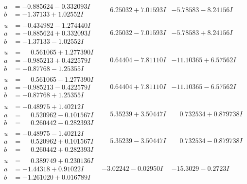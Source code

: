 \documentclass[1p]{elsarticle_modified}
\theoremstyle{definition}
\begin{document}
$$\begin{array}{c|c|c}
\begin{aligned}
a &= -0.885624 - 0.332093 I \\
b &= -1.37133 + 1.02552 I\end{aligned}
 & \phantom{-}6.25032 + 7.01593 I & -5.78583 - 8.24156 I \\ \hline\begin{aligned}
u &= -0.434982 - 1.274440 I \\
a &= -0.885624 + 0.332093 I \\
b &= -1.37133 - 1.02552 I\end{aligned}
 & \phantom{-}6.25032 - 7.01593 I & -5.78583 + 8.24156 I \\ \hline\begin{aligned}
u &= \phantom{-}0.561065 + 1.277390 I \\
a &= -0.985213 + 0.422579 I \\
b &= -0.87768 - 1.25355 I\end{aligned}
 & \phantom{-}0.64404 - 7.81110 I & -11.10365 + 6.57562 I \\ \hline\begin{aligned}
u &= \phantom{-}0.561065 - 1.277390 I \\
a &= -0.985213 - 0.422579 I \\
b &= -0.87768 + 1.25355 I\end{aligned}
 & \phantom{-}0.64404 + 7.81110 I & -11.10365 - 6.57562 I \\ \hline\begin{aligned}
u &= -0.48975 + 1.40212 I \\
a &= \phantom{-}0.520962 - 0.101567 I \\
b &= \phantom{-}0.260442 - 0.282393 I\end{aligned}
 & \phantom{-}5.35239 + 3.50447 I & \phantom{-}0.732534 + 0.879738 I \\ \hline\begin{aligned}
u &= -0.48975 - 1.40212 I \\
a &= \phantom{-}0.520962 + 0.101567 I \\
b &= \phantom{-}0.260442 + 0.282393 I\end{aligned}
 & \phantom{-}5.35239 - 3.50447 I & \phantom{-}0.732534 - 0.879738 I \\ \hline\begin{aligned}
u &= \phantom{-}0.389749 + 0.230136 I \\
a &= -1.44318 + 0.91022 I \\
b &= -1.261020 + 0.016789 I\end{aligned}
 & -3.02242 - 0.02950 I & -15.3029 - 0.2723 I \\ \hline\begin{aligned}

\end{aligned}
\end{array}$$
\end{document}
